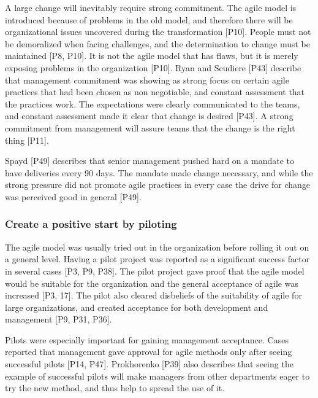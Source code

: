\documentclass[preprint,authoryear,12pt]{elsarticle}
\begin{document}

A large change will inevitably require strong commitment. The agile model is
introduced because of problems in the old model, and therefore there will be
organizational issues uncovered during the transformation [P10]. People must not
be demoralized when facing challenges, and the determination to change must be
maintained [P8, P10]. It is not the agile model that has flaws, but it is
merely exposing problems in the organization [P10].
Ryan and Scudiere [P43] describe that management commitment was showing as
strong focus on certain agile practices that had been chosen as non negotiable,
and constant assessment that the practices work. The expectations were clearly
communicated to the teams, and constant assessment made it clear that change is
desired [P43].
A strong commitment from management will assure teams that the change is the
right thing [P11].


Spayd [P49] describes that senior management pushed hard on a mandate to have
deliveries every 90 days. The mandate made change necessary, and while the
strong pressure did not promote agile practices in every case the drive for
change was perceived good in general [P49].



\subsubsection{Create a positive start by piloting}



The agile model was usually tried out in the organization before rolling it out
on a general level. Having a pilot project was reported as a significant success
factor in several cases [P3, P9, P38].
The pilot project gave proof that the agile model would be suitable for the
organization and the general acceptance of agile was increased [P3, 17].
The pilot also cleared disbeliefs of the suitability of agile for large
organizations, and created acceptance for both development and management [P9,
P31, P36].

Pilots were especially important for gaining management acceptance. Cases
reported that management gave approval for agile methods only after seeing
successful pilots [P14, P47]. Prokhorenko [P39] also describes that seeing the
example of successful pilots will make managers from other departments eager to
try the new method, and thus help to spread the use of it.
\end{document}
